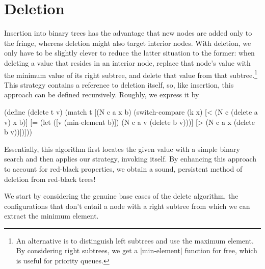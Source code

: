 \documentclass[preprint]{sigplanconf}
\begin{document}
\section{Deletion}

Insertion into binary trees has the advantage that new nodes are added only to the fringe, whereas deletion might also target interior nodes. With deletion, we only have to be slightly clever to reduce the latter situation to the former: when deleting a value that resides in an interior node, replace that node's value with the minimum value of its right subtree, and delete that value from that subtree.\footnote{An alternative is to distinguish left subtrees and use the maximum element. By considering right subtrees, we get a \scheme|min-element| function for free, which is useful for priority queues.} This strategy contains a reference to deletion itself, so, like insertion, this approach can be defined recursively. Roughly, we express it by
\begin{schemedisplay}
(define (delete t v)
  (match t
    [(N c a x b)
     (switch-compare
       (k x)
       [< (N c (delete a v) x b)]
       [= (let ([v (min-element b)])
            (N c a v (delete b v)))]
       [> (N c a x (delete b v))])]))
\end{schemedisplay}
Essentially, this algorithm first locates the given value with a simple binary search and then applies our strategy, invoking itself. By enhancing this approach to account for red-black properties, we obtain a sound, persistent method of deletion from red-black trees!

We start by considering the genuine base cases of the delete algorithm, the configurations that don't entail a node with a right subtree from which we can extract the minimum element.
\end{document}
